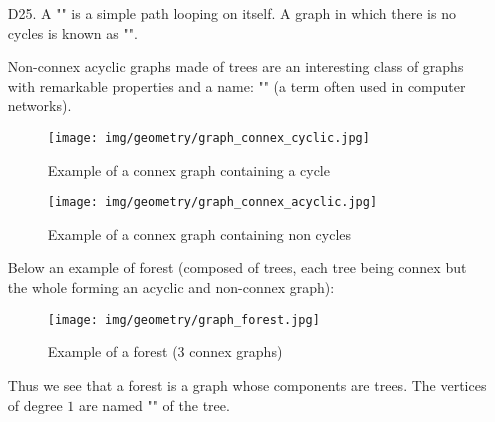{\begin{enumerate}
\begin{tcolorbox}[colframe=black,colback=white,sharp corners]
		Let us take for example a project that consists of the following tasks:
				
	The valued associated directed graph corresponding to this table once the definition of the critical path applied is the following using the start dates:	
	\end{tcolorbox}
	
	\pagebreak
	\begin{tcolorbox}[colframe=black,colback=white,sharp corners]
	\begin{figure}[H]
		\centering
		\texttt{[image: img/geometry/pert\_diagram.jpg]}
		\caption{PERT (Program Evaluation Review Technique) diagram}
	\end{figure}
	We see well in this graph that the finite set of tasks $\left\lbrace \text{Start}, \text{G}, \text{L}, \text{Fin}\right\rbrace$ are critical.\\
	
	A great tool for using such graphs is (among others) Microsoft Project whose the corresponding Gantt diagram for the example above is:
	\begin{figure}[H]
		\centering
		\texttt{[image: img/geometry/gantt\_example.jpg]}
		\caption{Same graph but seen in Microsoft Project 97}
	\end{figure}
	\end{tcolorbox}
	
	\item[D25.] A "" is a simple path looping on itself. A graph in which there is no cycles is known as "".
	
	Non-connex acyclic graphs made of trees are an interesting class of graphs with remarkable properties and a name: "" (a term often used in computer networks).
	\begin{figure}[H]
		\centering
		\texttt{[image: img/geometry/graph\_connex\_cyclic.jpg]}
		\caption{Example of a connex graph containing a cycle}
	\end{figure}
	\begin{figure}[H]
		\centering
		\texttt{[image: img/geometry/graph\_connex\_acyclic.jpg]}
		\caption{Example of a connex graph containing non cycles}
	\end{figure}
	Below an example of forest (composed of trees, each tree being connex but the whole forming an acyclic and non-connex graph):
	\begin{figure}[H]
		\centering
		\texttt{[image: img/geometry/graph\_forest.jpg]}
		\caption{Example of a forest (3 connex graphs)}
	\end{figure}
	Thus we see that a forest is a graph whose components are trees. The vertices of degree $1$ are named "" of the tree.
	

\end{enumerate}}
